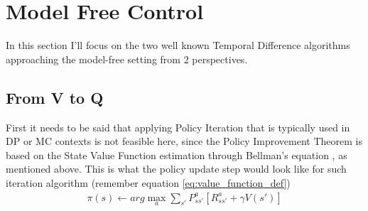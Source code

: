 



\section{Model Free Control }
In this section I'll focus on the two well known 
Temporal Difference algorithms approaching the model-free
setting from 2 perspectives. 


\subsection{From V to Q} 
First it needs to be said that applying Policy Iteration that is typically used in DP or MC contexts is not feasible here, since the Policy Improvement Theorem is based on the State Value Function estimation through Bellman's equation \cite{lecture_mfc}, as mentioned above. This is what the policy update step would look like for such iteration algorithm (remember equation \ref{eq:value_function_def})
\begin{align}
    \pi(s) \leftarrow arg \max_{a} \sum_{s'} P^{a}_{ss'} [R^{a}_{ss'} + \gamma V(s')]
\end{align}

